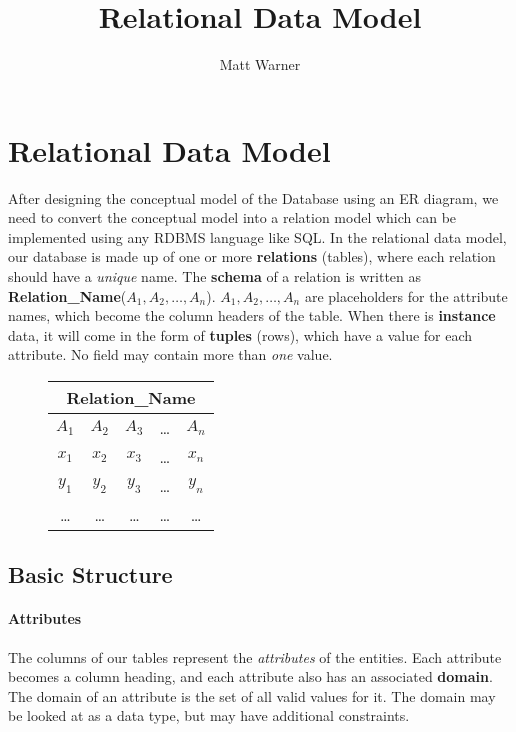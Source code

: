 \documentclass{report}
\title{\Huge{Relational Data Model}}
\author{\huge{Matt Warner}}
\date{\huge{}}
\begin{document}
    \maketitle
    \chapter{Relational Data Model}
    After designing the conceptual model of the Database using an ER diagram, we need to convert the conceptual model into a relation model which can be implemented using any RDBMS language like SQL.
    In the relational data model, our database is made up of one or more \textbf{relations} (tables), where each relation should have a \textit{unique} name. The \textbf{schema} of a relation is written as \textbf{Relation\_Name}($A_1,A_2,\ldots,A_n$). $A_1,A_2,\ldots,A_n$ are placeholders for the attribute names, which become the column headers of the table.
    \bigbreak \noindent
    When there is \textbf{instance} data, it will come in the form of \textbf{tuples} (rows), which have a value for each attribute. No field may contain more than \textit{one} value.
    \begin{figure}[H]
    \centering
    \setlength{\tabcolsep}{35}
    \begin{tabular}{|c|c|c|c|c|}
        \hline
        \multicolumn{5}{|c|}{\textbf{Relation\_Name}} \\
        \hline
        $A_1$ & $A_2$ & $A_3$ & \ldots & $A_n$ \\
        \hline
        $x_1$ & $x_2$ & $x_3$ & \ldots & $x_n$ \\
        \hline
        $y_1$ & $y_2$ & $y_3$ & \ldots & $y_n$ \\
        \hline
        \ldots & \ldots & \ldots & \ldots & \ldots \\
        \hline
    \end{tabular}
    \end{figure}
    \section{Basic Structure}
    \subsubsection*{Attributes}
    The columns of our tables represent the \textit{attributes} of the entities. Each attribute becomes a column heading, and each attribute also has an associated \textbf{domain}. The domain of an attribute is the set of all valid values for it. The domain may be looked at as a data type, but may have additional constraints.
\end{document}
